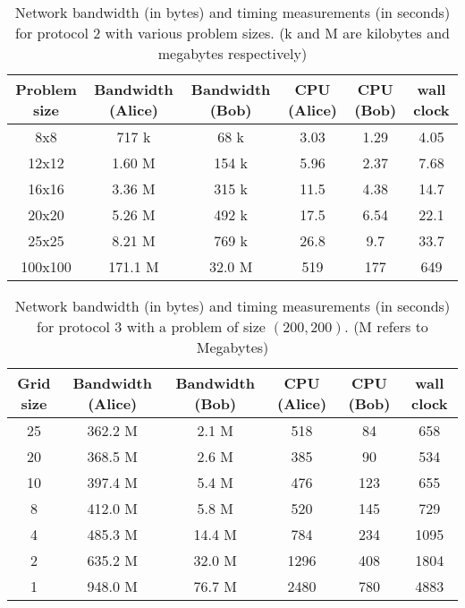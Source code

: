 %
\begin{table*}
\begin{center}
\begin{tabular}{|c||c|c|c|c|c|} \hline 
Problem size & Bandwidth (Alice) & Bandwidth (Bob) & CPU (Alice) & CPU (Bob) & wall clock \\ \hline \hline 
8x8 & 717 k & 68 k & 3.03 & 1.29 & 4.05 \\ \hline 
12x12 & 1.60 M & 154 k & 5.96 & 2.37 & 7.68 \\ \hline 
16x16 & 3.36 M & 315 k & 11.5 & 4.38 & 14.7 \\  \hline 
20x20 & 5.26 M & 492 k & 17.5 & 6.54 & 22.1 \\ \hline 
25x25 & 8.21 M & 769 k & 26.8 & 9.7 & 33.7 \\ \hline 
100x100 & 171.1 M& 32.0 M& 519 & 177 & 649 \\ \hline 
\end{tabular}
\end{center}

\caption{Network bandwidth (in bytes) and timing measurements (in seconds) for protocol 2 with
various problem sizes. (k and M are kilobytes and megabytes respectively)}
\label{protocol2table}
\end{table*}

\begin{table*}
\begin{center}
\begin{tabular}{|c||c|c|c|c|c|} \hline 
Grid size & Bandwidth (Alice) & Bandwidth (Bob) & CPU (Alice) & CPU (Bob) & wall clock \\ \hline \hline 
25 & 362.2 M & 2.1 M & 518 & 84 & 658 \\ \hline 
20 & 368.5 M & 2.6 M & 385 & 90 & 534 \\ \hline 
10 & 397.4 M & 5.4 M & 476 & 123 & 655 \\  \hline 
8 & 412.0 M & 5.8 M & 520 & 145 & 729 \\ \hline 
4 & 485.3 M & 14.4 M & 784 & 234 & 1095 \\ \hline 
2 & 635.2 M& 32.0 M& 1296 & 408 & 1804 \\ \hline 
1& 948.0 M& 76.7 M& 2480 & 780 & 4883 \\ \hline
\end{tabular}
\end{center}

\caption{Network bandwidth (in bytes) and timing measurements (in seconds) for protocol 3 with
a problem of size $(200,200)$. (M refers to Megabytes)}
\label{protocol3table200}
\end{table*}





